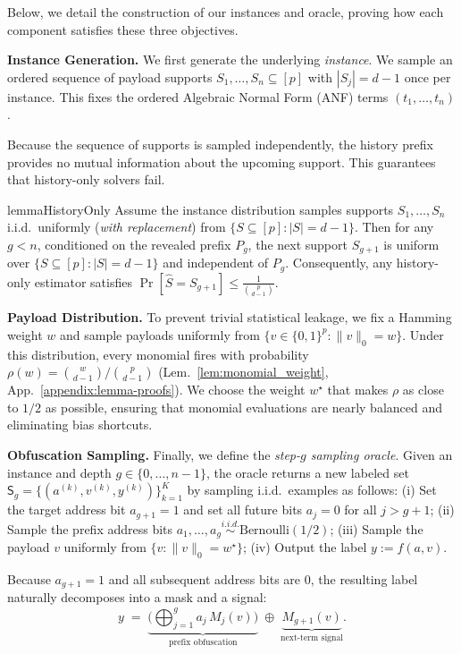 \documentclass{article}
\begin{document}
Below, we detail the construction of our instances and oracle, proving how each component satisfies these three objectives.

{\bf Instance Generation.\enspace} 
We first generate the underlying \emph{instance}. We sample an ordered sequence of payload supports $S_1,\dots,S_n\subseteq[p]$ with $|S_j|=d-1$ once per instance. This fixes the ordered Algebraic Normal Form (ANF) terms $(t_1,\dots,t_n)$. 

Because the sequence of supports is sampled independently, the history prefix provides no mutual information about the upcoming support. This guarantees that history-only solvers fail.

\begin{restatable}{lemma}{HistoryOnly}\label{lem:history_only}
Assume the instance distribution samples supports $S_1,\dots,S_n$ i.i.d.\ uniformly (\emph{with replacement}) from $\{S\subseteq[p]:|S|=d-1\}$. Then for any $g<n$, conditioned on the revealed prefix $P_g$, the next support $S_{g+1}$ is uniform over $\{S\subseteq[p]:|S|=d-1\}$ and independent of $P_g$. Consequently, any history-only estimator satisfies $\Pr[\widehat S = S_{g+1}] \le \tfrac{1}{\binom{p}{d-1}}$.
\end{restatable}

{\bf Payload Distribution.\enspace} 
To prevent trivial statistical leakage, we fix a Hamming weight $w$ and sample payloads uniformly from $\{v\in\{0,1\}^p:\|v\|_0=w\}$. Under this distribution, every monomial fires with probability $\rho(w) = \binom{w}{d-1}/\binom{p}{d-1}$ (Lem.~\ref{lem:monomial_weight}, App.~\ref{appendix:lemma-proofs}). We choose the weight $w^\star$ that makes $\rho$ as close to $1/2$ as possible, ensuring that monomial evaluations are nearly balanced and eliminating bias shortcuts.

{\bf Obfuscation Sampling.\enspace} 
Finally, we define the \emph{step-$g$ sampling oracle}. Given an instance and depth $g\in\{0,\dots,n-1\}$, the oracle returns a new labeled set $\mathsf S_g=\{(a^{(k)},v^{(k)},y^{(k)})\}_{k=1}^K$ by sampling i.i.d.\ examples as follows: 
(i) Set the target address bit $a_{g+1}=1$ and set all future bits $a_j=0$ for all $j>g+1$; 
(ii) Sample the prefix address bits $a_1,\dots,a_g \stackrel{i.i.d.}{\sim}\mathrm{Bernoulli}(1/2)$; 
(iii) Sample the payload $v$ uniformly from $\{v:\|v\|_0=w^\star\}$; 
(iv) Output the label $y := f(a,v)$.

Because $a_{g+1}=1$ and all subsequent address bits are $0$, the resulting label naturally decomposes into a mask and a signal:
\begin{equation}\label{eq:otp_decomp}
y \;=\; \underbrace{\Big(\bigoplus_{j=1}^{g} a_j\, M_j(v)\Big)}_{\text{prefix obfuscation}}
\;\oplus\;
\underbrace{M_{g+1}(v)}_{\text{next-term signal}}.
\end{equation}
\end{document}
